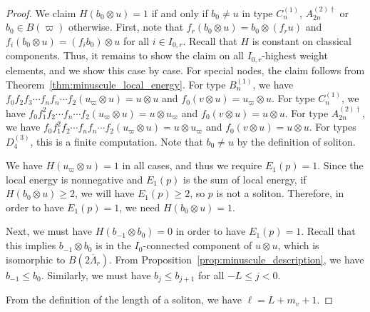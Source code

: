 \documentclass[reqno]{amsart}
\newcommand{\clfw}{\overline{\Lambda}} %
\theoremstyle{plain}
\theoremstyle{definition}
\numberwithin{equation}{section}
\begin{document}
\begin{proof}
We claim $H(b_0 \otimes u) = 1$ if and only if $b_0 \neq u$ in type $C_n^{(1)}$, $A_{2n}^{(2)\dagger}$ or $b_0 \in B(\varpi)$ otherwise.
First, note that $f_r(b_0 \otimes u) = b_0 \otimes (f_r u)$ and $f_i(b_0 \otimes u) = (f_i b_0) \otimes u$ for all $i \in I_{0,r}$.
Recall that $H$ is constant on classical components.
Thus, it remains to show the claim on all $I_{0,r}$-highest weight elements, and we show this case by case.
For special nodes, the claim follows from Theorem~\ref{thm:minuscule_local_energy}.
For type $B_n^{(1)}$, we have $f_0 f_2 f_3 \dotsm f_n f_n  \dotsm f_2 (u_{\varpi} \otimes u) = u \otimes u$ and $f_0(v \otimes u) = u_{\varpi} \otimes u$.
For type $C_n^{(1)}$, we have $f_0 f_1^2 f_2 \dotsm f_n \dotsm f_2 (u_{\varpi} \otimes u) = u \otimes u_{\varpi}$ and $f_0(v \otimes u) = u \otimes u$.
For type $A_{2n}^{(2)\dagger}$, we have $f_0 f_1^2 f_2 \dotsm f_n f_n \dotsm f_2 (u_{\varpi} \otimes u) = u \otimes u_{\varpi}$ and $f_0(v \otimes u) = u \otimes u$.
For types $D_4^{(3)}$, this is a finite computation.
Note that $b_0 \neq u$ by the definition of soliton.

We have $H(u_{\varpi} \otimes u) = 1$ in all cases, and thus we require $E_1(p) = 1$.
Since the local energy is nonnegative and $E_1(p)$ is the sum of local energy, if $H(b_0 \otimes u) \geq 2$, we will have  $E_1(p) \geq 2$, so $p$ is not a soliton.
Therefore, in order to have $E_1(p) = 1$, we need $H(b_0 \otimes u) = 1$.

Next, we must have $H(b_{-1} \otimes b_0) = 0$ in order to have $E_1(p) = 1$.
Recall that this implies $b_{-1} \otimes b_0$ is in the $I_0$-connected component of $u \otimes u$, which is isomorphic to $B(2\clfw_r)$.
From Proposition~\ref{prop:minuscule_description}, we have $b_{-1} \leq b_0$.
Similarly, we must have $b_j \leq b_{j+1}$ for all $-L \leq j < 0$.

From the definition of the length of a soliton, we have $\ell = L + m_v + 1$.
\end{proof}
\end{document}

